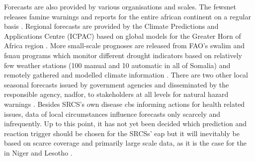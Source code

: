 Forecasts are also provided by various organisations and scales. The \acrshort{fewsnet} releases famine warnings and reports for the entire african continent on a regular basis \autocite{fewsnetFamineEarlyWarning2023}. Regional forecasts are provided by the Climate Predictions and Applications Centre (ICPAC) based on global models for the Greater Horn of Africa region \autocite{icpacDeliveringClimateServices2023}. More small-scale prognoses are released from FAO's \acrshort{swalim} and \acrshort{fsnau} programs which monitor different drought indicators based on relatively few weather stations (100 manual and 10 automatic in all of Somalia) and remotely gathered and modelled climate information \autocite{faoswalimSWALIMWeatherMonitoring2014,scrsFeasibilityStudyPotential2022}. There are two other local seasonal forecasts issued by government agencies and disseminated by the responsible agency, \acrshort{nadfor}, to stakeholders at all levels for natural hazard warnings \autocite{scrsFeasibilityStudyPotential2022}. Besides SRCS's own disease \acrshort{cbs} informing actions for health related issues, data of local circumstances influence forecasts only scarcely and infrequently.\newline
Up to this point, it has not yet been decided which prediction and reaction trigger should be chosen for the SRCSs' \acrshort{eap} but it will inevitably be based on scarce coverage and primarily large scale data, as it is the case for the  in Niger and Lesotho \autocite{lesothoredcrosssocietyEarlyActionProtocol2022,nigerredcrosssocietyNigerDroughtEarly2021}.

